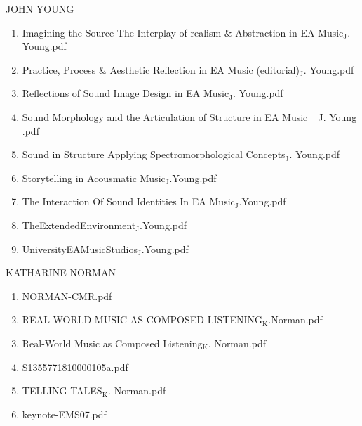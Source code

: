 \documentclass[11pt]{article}
\begin{document}
\item JOHN YOUNG
\label{sec-1-1-1-1-49-1-17}
\begin{enumerate}
\item Imagining the Source The Interplay of realism \& Abstraction in EA Music$_{\text{J}}$. Young.pdf
\label{sec-1-1-1-1-49-1-17-1}

\item Practice, Process \& Aesthetic Reflection in EA Music (editorial)$_{\text{J}}$. Young.pdf
\label{sec-1-1-1-1-49-1-17-2}

\item Reflections of Sound Image Design in EA Music$_{\text{J}}$. Young.pdf
\label{sec-1-1-1-1-49-1-17-3}

\item Sound Morphology and the Articulation of Structure in EA Music\_ J. Young .pdf
\label{sec-1-1-1-1-49-1-17-4}

\item Sound in Structure Applying Spectromorphological Concepts$_{\text{J}}$. Young.pdf
\label{sec-1-1-1-1-49-1-17-5}

\item Storytelling in Acousmatic Music$_{\text{J}}$.Young.pdf
\label{sec-1-1-1-1-49-1-17-6}

\item The Interaction Of Sound Identities In EA Music$_{\text{J}}$.Young.pdf
\label{sec-1-1-1-1-49-1-17-7}

\item TheExtendedEnvironment$_{\text{J}}$.Young.pdf
\label{sec-1-1-1-1-49-1-17-8}

\item UniversityEAMusicStudios$_{\text{J}}$.Young.pdf
\label{sec-1-1-1-1-49-1-17-9}
\end{enumerate}

\item KATHARINE NORMAN
\label{sec-1-1-1-1-49-1-18}
\begin{enumerate}
\item NORMAN-CMR.pdf
\label{sec-1-1-1-1-49-1-18-1}

\item REAL-WORLD MUSIC AS COMPOSED LISTENING$_{\text{K}}$.Norman.pdf
\label{sec-1-1-1-1-49-1-18-2}

\item Real-World Music as Composed Listening$_{\text{K}}$. Norman.pdf
\label{sec-1-1-1-1-49-1-18-3}

\item S1355771810000105a.pdf
\label{sec-1-1-1-1-49-1-18-4}

\item TELLING TALES$_{\text{K}}$. Norman.pdf
\label{sec-1-1-1-1-49-1-18-5}

\item keynote-EMS07.pdf
\label{sec-1-1-1-1-49-1-18-6}
\end{enumerate}
\end{document}
